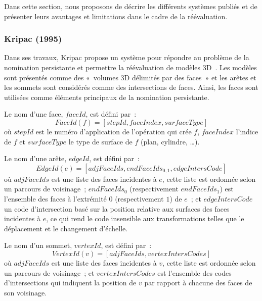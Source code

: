 Dans cette section, nous proposons de décrire les différents systèmes publiés et de présenter leurs avantages et limitations dans le cadre de la réévaluation. %


\subsubsection*{Kripac (1995) }


Dans ses travaux, Kripac propose un système pour répondre au problème de la
nomination persistante et permettre la réévaluation de modèles
3D~\cite{kripac1995mechanism}. %
Les modèles sont présentés comme des «~volumes 3D délimités par des faces~» et
les arêtes et les sommets sont considérés comme des intersections de faces. %
Ainsi, les faces sont utilisées comme éléments principaux de la nomination
persistante. %

Le nom d'une face, \(faceId\), est défini par~:
\[FaceId(f) = [stepId,faceIndex,surfaceType]\] %
où \(stepId\) est le numéro d'application de l'opération qui crée \(f\),
\(faceIndex\) l'indice de \(f\) et \(surfaceType\) le type de surface de \(f\) (plan, cylindre, …). %

Le nom d'une arête, \(edgeId\), est défini par~:
\[EdgeId(e) = [adjFaceIds,endFaceIds_{0,1},edgeIntersCode]\] %
où \(adjFaceIds\) est une liste des faces incidentes à \(e\), cette liste est
ordonnée selon un parcours de voisinage~; \(endFaceIds_{0}\) (respectivement
\(endFaceIds_{1}\)) est l'ensemble des faces à l'extrémité \(0\) (respectivement
\(1\)) de \(e\)~; et \(edgeIntersCode\) un code d'intersection basé sur la
position relative aux surfaces des faces incidentes à \(e\), ce qui rend le
code insensible aux transformations telles que le déplacement et le changement
d'échelle. %

Le nom d'un sommet, \(vertexId\), est défini par~:
\[VertexId(v) = [adjFaceIds,vertexIntersCodes]\] %
où \(adjFaceIds\) est une liste des faces incidentes à \(v\), cette liste est
ordonnée selon un parcours de voisinage~; et \(vertexIntersCodes\) est
l'ensemble des codes d'intersections qui indiquent la position de \(v\) par rapport à chacune des faces de
son voisinage.

